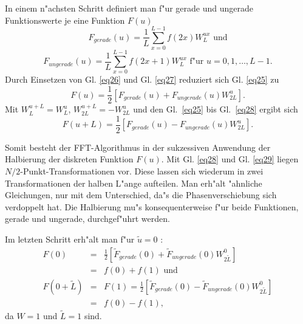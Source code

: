 In einem  n"achsten Schritt definiert man f"ur gerade und ungerade
Funk\-tions\-werte je eine Funktion $F(u)$
\begin{equation} 
\label{eq26}
F_{gerade}(u) = \frac{1}{L} \sum \limits_{x=0}^{L-1}f(2x) W_{L}^{ux} 
\textrm{ und}
\end{equation}
\begin{equation} 
\label{eq27}
F_{ungerade}(u) = \frac{1}{L} \sum \limits_{x=0}^{L-1}f(2x+1) W_{L}^{ux}
\textrm{ f"ur $u=0,1,\dots,L-1$.}
\end{equation}
Durch  Einsetzen  von Gl. \ref{eq26} und Gl. \ref{eq27}  reduziert  sich
Gl. \ref{eq25} zu
\begin{equation}
\label{eq28}
F(u) = \frac{1}{2} \left [ F_{gerade}(u) + F_{ungerade}(u) W_{2L}^{u} \right ]
\textrm{.}
\end{equation}
Mit $W_{L}^{u+L} = W_{L}^{u}$, $W_{2L}^{u+L} = -W_{2L}^{u}$ und den Gl.~\ref{eq25}
bis Gl.~\ref{eq28} ergibt sich
\begin{equation}
\label{eq29}
F(u+L) = \frac{1}{2} \left [ F_{gerade}(u) - F_{ungerade}(u) W_{2L}^{u} \right ]
\textrm{.}
\end{equation}

Somit  besteht  der  FFT-Algorithmus  in  der  sukzessiven
Anwendung  der Halbierung der diskreten Funktion $F(u)$.  Mit
Gl.  \ref{eq28} und Gl. \ref{eq29} liegen $N/2$-Punkt-Transformationen vor.
Diese  lassen  sich  wiederum in zwei Transformationen  der
halben  L"ange  aufteilen. Man erh"alt "ahnliche  Gleichungen,
nur  mit  dem Unterschied, da"s die Phasenverschiebung  sich
verdoppelt  hat.  Die  Halbierung mu"s konsequenterweise  f"ur  beide
Funktionen, gerade und ungerade, durchgef"uhrt werden.

Im letzten Schritt erh"alt man f"ur $\tilde{u}=0$ :
\begin{eqnarray}
F(0) &=& \frac{1}{2} \left [ \tilde{F}_{gerade}(0) + \tilde{F}_{ungerade}(0)
         W_{2\tilde{L}}^{0} \right ] \nonumber \\
     &=& f(0)+f(1)
\textrm{ und }\\
F(0+\tilde{L}) &=& F(1) = \frac{1}{2} \left [ \tilde{F}_{gerade}(0) - 
         \tilde{F}_{ungerade}(0) W_{2\tilde{L}}^{0} \right ] \nonumber \\
     &=& f(0)-f(1),
\end{eqnarray}
da $W=1$ und $\tilde{L}=1$ sind.

